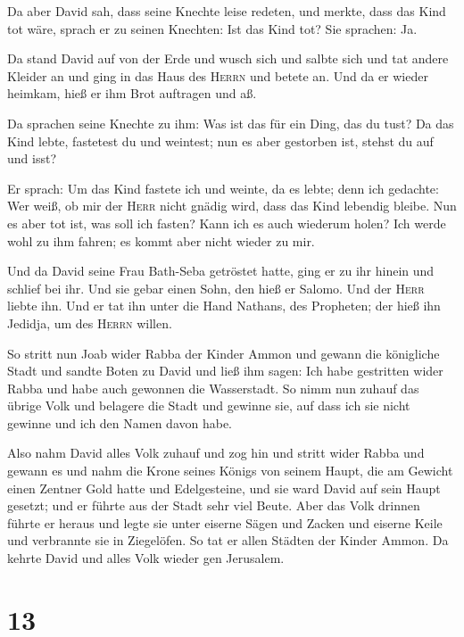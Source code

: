  Da aber David sah, dass seine Knechte leise redeten, und
merkte, dass das Kind tot wäre, sprach er zu seinen Knechten: Ist das
Kind tot? Sie sprachen: Ja.

 Da stand David auf von der Erde und wusch sich und
salbte sich und tat andere Kleider an und ging in das Haus des
\textsc{Herrn} und betete an. Und da er wieder heimkam, hieß er ihm Brot
auftragen und aß.

 Da sprachen seine Knechte zu ihm: Was ist das für ein
Ding, das du tust? Da das Kind lebte, fastetest du und weintest; nun es
aber gestorben ist, stehst du auf und isst?

 Er sprach: Um das Kind fastete ich und weinte, da es
lebte; denn ich gedachte: Wer weiß, ob mir der \textsc{Herr} nicht
gnädig wird, dass das Kind lebendig bleibe.  Nun es aber
tot ist, was soll ich fasten? Kann ich es auch wiederum holen? Ich werde
wohl zu ihm fahren; es kommt aber nicht wieder zu mir.

 Und da David seine Frau Bath-Seba getröstet hatte, ging
er zu ihr hinein und schlief bei ihr. Und sie gebar einen Sohn, den hieß
er Salomo. Und der \textsc{Herr} liebte ihn.  Und er tat
ihn unter die Hand Nathans, des Propheten; der hieß ihn Jedidja, um des
\textsc{Herrn} willen.

 So stritt nun Joab wider Rabba der Kinder Ammon und
gewann die königliche Stadt  und sandte Boten zu David
und ließ ihm sagen: Ich habe gestritten wider Rabba und habe auch
gewonnen die Wasserstadt.  So nimm nun zuhauf das übrige
Volk und belagere die Stadt und gewinne sie, auf dass ich sie nicht
gewinne und ich den Namen davon habe.

 Also nahm David alles Volk zuhauf und zog hin und stritt
wider Rabba und gewann es  und nahm die Krone seines
Königs von seinem Haupt, die am Gewicht einen Zentner Gold hatte und
Edelgesteine, und sie ward David auf sein Haupt gesetzt; und er führte
aus der Stadt sehr viel Beute.  Aber das Volk drinnen
führte er heraus und legte sie unter eiserne Sägen und Zacken und
eiserne Keile und verbrannte sie in Ziegelöfen. So tat er allen Städten
der Kinder Ammon. Da kehrte David und alles Volk wieder gen Jerusalem.

\hypertarget{section-12}{%
\section{13}\label{section-12}}

